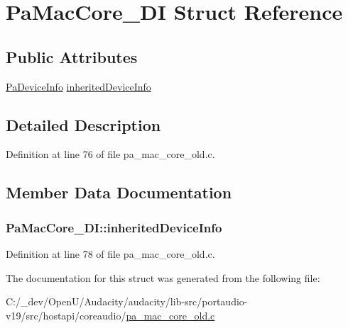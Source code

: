 \hypertarget{struct_pa_mac_core___d_i}{}\section{Pa\+Mac\+Core\+\_\+\+DI Struct Reference}
\label{struct_pa_mac_core___d_i}
\subsection*{Public Attributes}
\begin{DoxyCompactItemize}
\item 
\hyperlink{struct_pa_device_info}{Pa\+Device\+Info} \hyperlink{struct_pa_mac_core___d_i_a7dd579134e0609f6e8cd3ad5f5458537}{inherited\+Device\+Info}
\end{DoxyCompactItemize}


\subsection{Detailed Description}


Definition at line 76 of file pa\+\_\+mac\+\_\+core\+\_\+old.\+c.



\subsection{Member Data Documentation}
\subsubsection[{\texorpdfstring{inherited\+Device\+Info}{inheritedDeviceInfo}}]{ Pa\+Mac\+Core\+\_\+\+D\+I\+::inherited\+Device\+Info}\hypertarget{struct_pa_mac_core___d_i_a7dd579134e0609f6e8cd3ad5f5458537}{}\label{struct_pa_mac_core___d_i_a7dd579134e0609f6e8cd3ad5f5458537}


Definition at line 78 of file pa\+\_\+mac\+\_\+core\+\_\+old.\+c.



The documentation for this struct was generated from the following file\+:\begin{DoxyCompactItemize}
\item 
C\+:/\+\_\+dev/\+Open\+U/\+Audacity/audacity/lib-\/src/portaudio-\/v19/src/hostapi/coreaudio/\hyperlink{pa__mac__core__old_8c}{pa\+\_\+mac\+\_\+core\+\_\+old.\+c}\end{DoxyCompactItemize}
